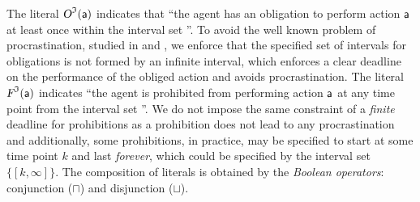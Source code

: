 The literal $\textsl{O}^{\mathfrak{I}}(\mathsf{a})$ indicates that  ``the agent has an obligation to perform action $\mathsf{a} $ at least once within the interval set \is''. To avoid the well known problem of procrastination, studied in \cite{DBLP:conf/deon/BroersenDDM04} and  \cite{DBLP:conf/prima/BoellaBT08},  we enforce that the specified set of intervals for obligations is not formed by an infinite interval, which enforces a clear deadline on the performance of the obliged action and avoids procrastination.
The literal $\textsl{F}^{\mathfrak{I}}(\mathsf{a})$ indicates ``the agent is prohibited from performing action $\mathsf{a} $ at any time point from the interval set \is''. We do not impose the same constraint of a \emph{finite} deadline for prohibitions as a prohibition does not lead to any procrastination and additionally, some prohibitions, in practice, may be specified to start at some time point $k$ and last \emph{forever}, which could be specified by the interval set $\{[k,\infty]\}$.
The composition of literals is obtained by the \emph{Boolean operators}: conjunction (\(\sqcap\)) and disjunction (\(\sqcup\)).






